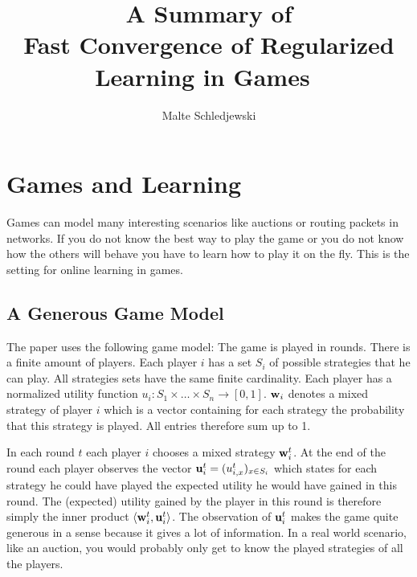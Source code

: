 \documentclass[a4paper]{article}
\title{A Summary of \\Fast Convergence of Regularized Learning in Games~\cite[]{2015arXiv150700407S}}
\author{Malte Schledjewski}
\theoremstyle{definition}
\newcommand{\mst}{\ensuremath{w}}
\renewcommand{\vec}[1]{\ensuremath{{\bf #1}}}
\newcommand{\dotp}[2]{\ensuremath{\left\langle #1, #2 \right\rangle}}
\begin{document}




\maketitle

\section{Games and Learning}

Games can model many interesting scenarios like auctions or routing
packets in networks.
If you do not know the best way to play the game or you do not know
how the others will behave you have to learn how to play it
on the fly.
This is the setting for online learning in games.




\subsection{A Generous Game Model}
The paper uses the following game model:
The game is played in rounds.
There is a finite amount of players.
Each player $i$ has a set $S_i$ of possible strategies that he can play.
All strategies sets have the same finite cardinality.
Each player has a normalized utility function
$u_i: S_1\times \ldots \times S_n \rightarrow [0,1]$.
 $\vec{w}_i$ denotes a mixed strategy of player $i$ which is a
 vector containing for each strategy the probability that this
 strategy is played. All entries therefore sum up to 1. 

In each round $t$ each player $i$ chooses a mixed strategy $\vec{\mst}_i^t$.
At the end of the round each player observes the vector $\vec{u}_i^t =
(u_{i,x}^t)_{x\in S_i}$
which states for each strategy he could have played the expected
utility he would have gained in this round.
The (expected) utility gained by the player in this round is therefore simply the
inner product $\dotp{ \vec{\mst}_i^t}{\vec{u}_i^t}$.
The observation of $\vec{u}_i^t$ makes the game quite generous in a sense because it gives a lot
of information. In a real world scenario, like an auction, you would
probably only get to know the played strategies of all the players.
\end{document}
